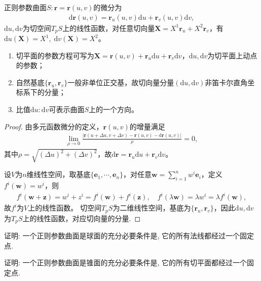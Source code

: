 \documentclass[../../main.tex]{subfiles}%
\begin{document}
\begin{proposition}
正则参数曲面$S:\bm r=\bm r(u,v)$的微分为
\begin{align}
\mathrm{d}\bm r(u,v)=\bm r_u(u,v)\mathrm{d}u+\bm r_v(u,v)\mathrm{d}v,
\label{eq:surfdiff}
\end{align}
$\mathrm{d}u,\mathrm{d}v$为切空间$T_pS$上的线性函数，对任意切向量$\bm X=X^1\bm r_u+X^2\bm r_v$，有$\mathrm{d}u(\bm X)=X^1,\;\mathrm{d}v(\bm X)=X^2$。
\end{proposition}
\begin{remark}
\begin{enumerate}[(1)]
\item 切平面的参数方程可写为$\bm X=\bm r(u,v)+\bm r_u\mathrm{d}u+\bm r_v\mathrm{d}v$，$\mathrm{d}u,\mathrm{d}v$为切平面上动点的参数；
\item 自然基底$\{\bm r_u,\bm r_v\}$一般非单位正交基，故切向量分量$(\mathrm{d}u,\mathrm{d}v)$非笛卡尔直角坐标系下的分量；
\item 比值$\mathrm{d}u:\mathrm{d}v$可表示曲面$S$上的一个方向。
\end{enumerate}
\end{remark}
\begin{proof}

由多元函数微分的定义，$\bm r(u,v)$的增量满足
\begin{align*}
\lim\limits_{\rho\to0}\frac{|\bm r(u+\Delta u,v+\Delta v)-\bm r(u,v)-\mathrm{d}\bm r(u,v)|}{\rho}=0,
\end{align*}
其中$\rho=\sqrt{(\Delta u)^2+(\Delta v)^2}$，故$\mathrm{d}\bm r=\bm r_u\mathrm{d}u+\bm r_v\mathrm{d}v$。

设$V$为$n$维线性空间，取基底$\{\bm e_1,\cdots,\bm e_n\}$，对任意$\bm w=\sum\limits_{i=1}^nw^i\bm e_i$，定义$f^i(\bm w)=w^i$，则
\begin{align*}
f^i(\bm w+\bm z)=w^i+z^i=f^i(\bm w)+f^i(\bm z),\quad f^i(\lambda\bm w)=\lambda w^i=\lambda f^i(\bm w),
\end{align*}
故$f^i$为$V$上的线性函数。
切空间$T_pS$为二维线性空间，基底为$\{\bm r_u,\bm r_v\}$，因此$\mathrm{d}u,\mathrm{d}v$为$T_pS$上的线性函数，对应切向量的分量.

\end{proof}

\begin{example}
证明: 一个正则参数曲面是球面的充分必要条件是, 它的所有法线都经过一个固定点.
\end{example}

\begin{example}
证明: 一个正则参数曲面是锥面的充分必要条件是, 它的所有切平面都经过一个固定点.
\end{example}
\end{document}
